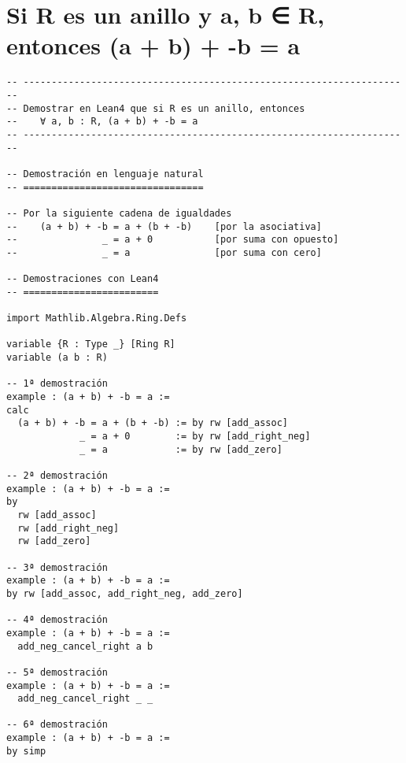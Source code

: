 \section{Si R es un anillo y a, b ∈ R, entonces (a + b) + -b = a}
\label{sec:org3e57bd7}
\begin{verbatim}
-- ---------------------------------------------------------------------
-- Demostrar en Lean4 que si R es un anillo, entonces
--    ∀ a, b : R, (a + b) + -b = a
-- ---------------------------------------------------------------------

-- Demostración en lenguaje natural
-- ================================

-- Por la siguiente cadena de igualdades
--    (a + b) + -b = a + (b + -b)    [por la asociativa]
--               _ = a + 0           [por suma con opuesto]
--               _ = a               [por suma con cero]

-- Demostraciones con Lean4
-- ========================

import Mathlib.Algebra.Ring.Defs

variable {R : Type _} [Ring R]
variable (a b : R)

-- 1ª demostración
example : (a + b) + -b = a :=
calc
  (a + b) + -b = a + (b + -b) := by rw [add_assoc]
             _ = a + 0        := by rw [add_right_neg]
             _ = a            := by rw [add_zero]

-- 2ª demostración
example : (a + b) + -b = a :=
by
  rw [add_assoc]
  rw [add_right_neg]
  rw [add_zero]

-- 3ª demostración
example : (a + b) + -b = a :=
by rw [add_assoc, add_right_neg, add_zero]

-- 4ª demostración
example : (a + b) + -b = a :=
  add_neg_cancel_right a b

-- 5ª demostración
example : (a + b) + -b = a :=
  add_neg_cancel_right _ _

-- 6ª demostración
example : (a + b) + -b = a :=
by simp
\end{verbatim}

